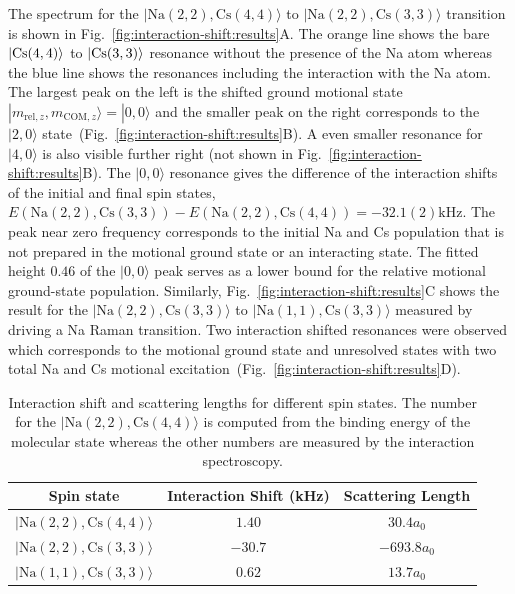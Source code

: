The spectrum for the $|\mathrm{Na(2, 2),Cs(4, 4)}\rangle$ to $|\mathrm{Na(2, 2),Cs(3, 3)}\rangle$
transition is shown in Fig.~\ref{fig:interaction-shift:results}A.
The orange line shows the bare $|\mathrm{Cs}(4, 4)\rangle$ to $|\mathrm{Cs}(3, 3)\rangle$ resonance without
the presence of the Na atom whereas the blue line shows the resonances
including the interaction with the Na atom.
The largest peak on the left is the shifted ground motional state
$|m_{\mathrm{rel},z},m_{\mathrm{COM},z}\rangle = |0,0\rangle$ and the smaller peak on the right
corresponds to the $|2,0\rangle$ state~(Fig.~\ref{fig:interaction-shift:results}B).
A even smaller resonance for $|4,0\rangle$ is also visible further right
(not shown in Fig.~\ref{fig:interaction-shift:results}B).
The $|0,0\rangle$ resonance gives the difference of the interaction shifts
of the initial and final spin states,
$E(\mathrm{Na(2, 2),Cs(3, 3)}) - E(\mathrm{Na(2, 2),Cs(4, 4)})=-32.1(2) \mathrm{kHz}$.
The peak near zero frequency corresponds to the initial Na and Cs population that is not prepared
in the motional ground state or an interacting state.
The fitted height $0.46$ of the $|0,0\rangle$ peak serves as a lower bound for
the relative motional ground-state population.
Similarly, Fig.~\ref{fig:interaction-shift:results}C shows the result for
the $|\mathrm{Na(2, 2),Cs(3, 3)}\rangle$ to $|\mathrm{Na(1, 1),Cs(3, 3)}\rangle$
measured by driving a Na Raman transition.
Two interaction shifted resonances were observed which corresponds to
the motional ground state and unresolved states with two total
Na and Cs motional excitation~(Fig.~\ref{fig:interaction-shift:results}D).

\begin{table}
  \centering
  \caption[Interaction shift and scattering lengths.]{
    Interaction shift and scattering lengths for different spin states.
    The number for the $|\mathrm{Na(2, 2),Cs(4, 4)}\rangle$ is computed from
    the binding energy of the molecular state whereas the other numbers are
    measured by the interaction spectroscopy.
    \label{table:interaction-shift:results}}
  \begin{tabular}{|c|c|c|}
    \hline
    Spin state&Interaction Shift (kHz)&Scattering Length\\\hline
    $|\mathrm{Na(2, 2),Cs(4, 4)}\rangle$&$1.40$&$30.4a_0$\\\hline
    $|\mathrm{Na(2, 2),Cs(3, 3)}\rangle$&$-30.7$&$-693.8a_0$\\\hline
    $|\mathrm{Na(1, 1),Cs(3, 3)}\rangle$&$0.62$&$13.7a_0$\\\hline
  \end{tabular}
\end{table}

